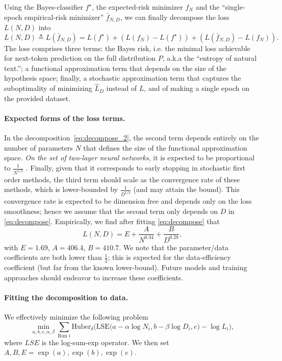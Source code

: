 \documentclass[11pt, a4paper, logo, copyright, nonumbering]{deepmind}
\begin{document}
Using the Bayes-classifier $f^\star$, the expected-risk minimizer $f_N$ and the ``single-epoch empirical-risk minimizer'' $\bar f_{N,D}$, we can finally decompose the loss $L(N,D)$ into
\begin{equation}\label{eq:decompose_2}
    L(N,D) \triangleq L(\bar f_{N,D}) = L(f^\star) + \left( L(f_N) - L(f^\star) \right) + \left( L(\bar f_{N,D}) - L(f_N) \right).
\end{equation}
The loss comprises three terms: the Bayes risk, i.e. the minimal loss achievable for next-token prediction on the full distribution $P$, a.k.a the ``entropy of natural text.''; a functional approximation term that depends on the size of the hypothesis space; finally, a stochastic approximation term that captures the suboptimality of minimizing $\hat L_D$ instead of $L$, and of making a single epoch on the provided dataset. 

\paragraph{Expected forms of the loss terms.}
In the decomposition~\eqref{eq:decompose_2}, the second term depends entirely on the number of parameters $N$ that defines the size of the functional approximation space.
\textit{On the set of two-layer neural networks}, it is expected to be proportional to $\frac{1}{N^{1/2}}$ \citep{siegel_approximation_2020}.
Finally, given that it corresponds to early stopping in stochastic first order methods, the third term should scale as the convergence rate of these methods, which is lower-bounded by $\frac{1}{D^{1/2}}$ \citep{robbins_stochastic_1951}  (and may attain the bound). This convergence rate is expected to be dimension free \cite[see e.g.][for a review]{bubeck_convex_2015} and depends only on the loss smoothness; hence we assume that the second term only depends on $D$ in \eqref{eq:decompose}.
Empirically, we find after fitting \eqref{eq:decompose} that
\begin{equation}
    L(N, D) = E + \frac{A}{N^{0.34}} + \frac{B}{D^{0.28}},
\end{equation}
with $E=1.69$, $A=406.4$, $B=410.7$. We note that the parameter/data coefficients are both lower than $\frac{1}{2}$; this is expected for the data-efficiency coefficient (but far from the known lower-bound).
Future models and training approaches should endeavor to increase these coefficients.

\paragraph{Fitting the decomposition to data.} We effectively minimize the following problem
\begin{equation}
     \min_{a, b, e, \alpha, \beta}  \sum_{\text{Run }i} \text{Huber}_\delta \Big(\text{LSE}\big(a - \alpha \log N_i, b- \beta \log D_i, e \big) - \log L_i\Big),\label{eq:lse}
\end{equation}
where $LSE$ is the log-sum-exp operator. We then set $A, B, E = \exp(a), \exp(b), \exp(e)$. 
\end{document}
